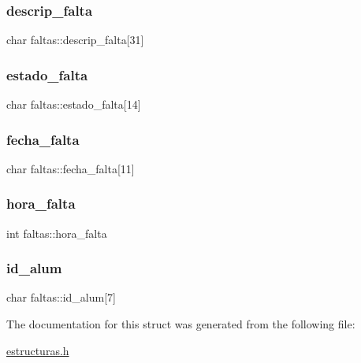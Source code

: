 \subsubsection{\texorpdfstring{descrip\+\_\+falta}{descrip\_falta}}
{\footnotesize\ttfamily char faltas\+::descrip\+\_\+falta\mbox{[}31\mbox{]}}

\mbox{\label{structfaltas_abcd66e5b1e7f572c68cfc2d860289ee3}} 
\subsubsection{\texorpdfstring{estado\+\_\+falta}{estado\_falta}}
{\footnotesize\ttfamily char faltas\+::estado\+\_\+falta\mbox{[}14\mbox{]}}

\mbox{\label{structfaltas_af129c434d523f950657f329ee13598b5}} 
\subsubsection{\texorpdfstring{fecha\+\_\+falta}{fecha\_falta}}
{\footnotesize\ttfamily char faltas\+::fecha\+\_\+falta\mbox{[}11\mbox{]}}

\mbox{\label{structfaltas_a896bc2033259f82ae633907298b3a65d}} 
\subsubsection{\texorpdfstring{hora\+\_\+falta}{hora\_falta}}
{\footnotesize\ttfamily int faltas\+::hora\+\_\+falta}

\mbox{\label{structfaltas_adf78bf54f25af0e394df78fc3ef765fa}} 
\subsubsection{\texorpdfstring{id\+\_\+alum}{id\_alum}}
{\footnotesize\ttfamily char faltas\+::id\+\_\+alum\mbox{[}7\mbox{]}}



The documentation for this struct was generated from the following file\+:\begin{DoxyCompactItemize}
\item 
\mbox{\hyperlink{estructuras_8h}{estructuras.\+h}}\end{DoxyCompactItemize}
